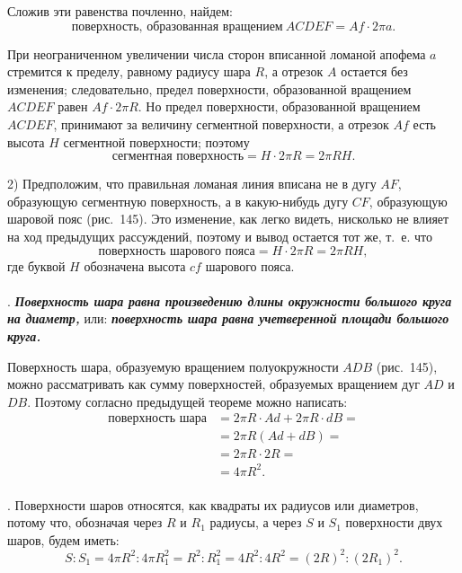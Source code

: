 \documentclass[twoside]{book}
\begin{document}
Сложив эти равенства почленно, найдем: %
\[\text{поверхность, образованная вращением}\ ACDEF = Af \cdot 2\pi a.\]

При неограниченном увеличении числа сторон вписанной ломаной апофема $a$ стремится к пределу, равному радиусу шара $R$, а отрезок $A$ остается без изменения;
следовательно, предел поверхности, образованной вращением $ACDEF$ равен $Af\cdot 2\pi R$.
Но предел поверхности, образованной вращением $ACDEF$, принимают за величину сегментной поверхности, а отрезок $Af$ есть высота $H$ сегментной поверхности;
поэтому
\[\text{сегментная поверхность} = H\cdot 2\pi R = 2\pi RH.\]

2) Предположим, что правильная ломаная линия вписана не в дугу $AF$, образующую сегментную поверхность, а в какую-нибудь дугу $CF$, образующую шаровой пояс (рис.~145).
Это изменение, как легко видеть, нисколько не влияет на ход предыдущих рассуждений, поэтому и вывод остается тот же, т.~е. что
\[\text{поверхность шарового пояса} = H \cdot 2\pi R = 2\pi RH,\]
где буквой $H$ обозначена высота $cf$ шарового пояса.

\paragraph{}\label{1938/s138}
.
\textbf{\emph{Поверхность шара равна произведению длины окружности большого круга на диаметр,}} или: \textbf{\emph{поверхность шара равна учетверенной площади большого круга.}}

Поверхность шара, образуемую вращением полуокружности $ADB$ (рис.~145), можно рассматривать как сумму поверхностей, образуемых вращением дуг $AD$ и $DB$.
Поэтому согласно предыдущей теореме можно написать:
\begin{align*}
\text{поверхность шара} &= 2\pi R\cdot Ad + 2\pi R\cdot dB =
\\
&=2\pi R(Ad + dB) =
\\
&= 2\pi R\cdot 2R = 
\\
&=4\pi R^2.
\end{align*}

\paragraph{}\label{1938/s139}
.
Поверхности шаров относятся, как квадраты их радиусов или диаметров, потому что, обозначая через $R$ и $R_1$ радиусы, а через $S$ и $S_1$ поверхности двух шаров, будем иметь:
\[S : S_1 = 4\pi R^2 : 4\pi R^2_1 = R^2 : R^2_1 = 4R^2 : 4R^2 = (2R)^2 : (2R_1)^2.\] %
\end{document}
